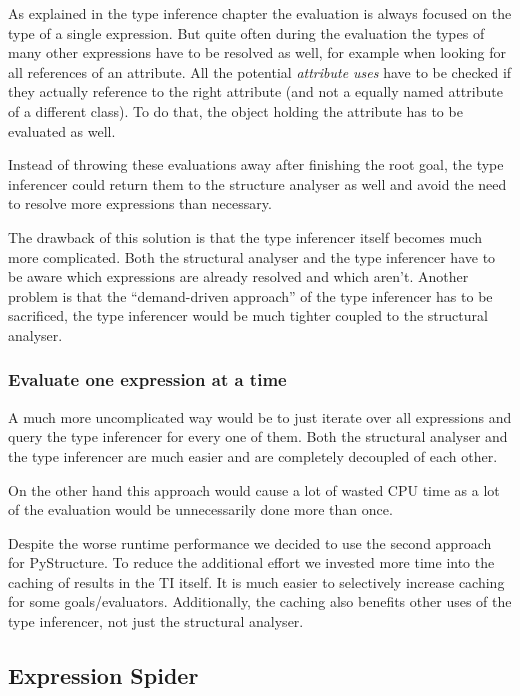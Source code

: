 \documentclass[12pt,halfparskip,DIV11,BCOR10mm]{scrreprt}
\begin{document}
As explained in the type inference chapter the evaluation is always focused on the type of a single expression. But quite often during the evaluation the types of many other expressions have to be resolved as well, for example when looking for all references of an attribute. All the potential \emph{attribute uses} have to be checked if they actually reference to the right attribute (and not a equally named attribute of a different class). To do that, the object holding the attribute has to be evaluated as well.

Instead of throwing these evaluations away after finishing the root goal, the type inferencer could return them to the structure analyser as well and avoid the need to resolve more expressions than necessary.

The drawback of this solution is that the type inferencer itself becomes much more complicated. Both the structural analyser and the type inferencer have to be aware which expressions are already resolved and which aren't. Another problem is that the ``demand-driven approach'' of the type inferencer has to be sacrificed, the type inferencer would be much tighter coupled to the structural analyser.

\subsubsection{Evaluate one expression at a time}

A much more uncomplicated way would be to just iterate over all expressions and query the type inferencer for every one of them. Both the structural analyser and the type inferencer are much easier and are completely decoupled of each other.

On the other hand this approach would cause a lot of wasted CPU time as a lot of the evaluation would be unnecessarily done more than once.

Despite the worse runtime performance we decided to use the second approach for PyStructure. To reduce the additional effort we invested more time into the caching of results in the TI itself. It is much easier to selectively increase caching for some goals/evaluators. Additionally, the caching also benefits other uses of the type inferencer, not just the structural analyser.

\subsection{Expression Spider}
\label{sa_exp_spider}
\end{document}
